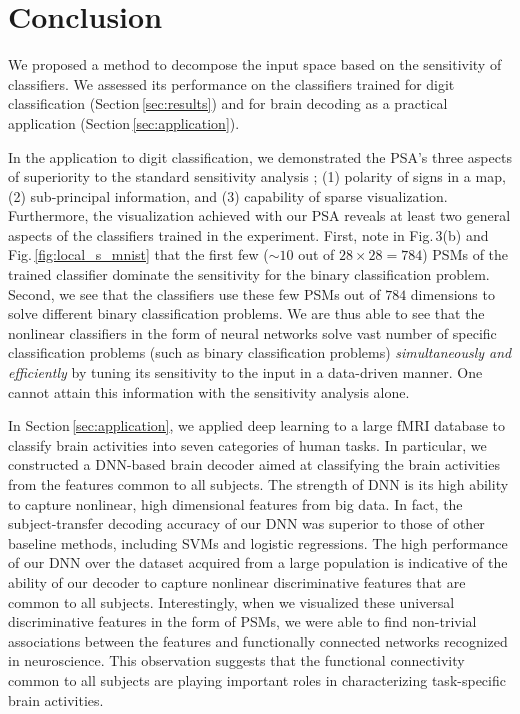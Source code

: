 \section{Conclusion}
\label{sec:discussion}
We proposed a method to decompose the input space based
on the sensitivity of classifiers.
%
We assessed its performance on the classifiers trained for
digit classification (Section\,\ref{sec:results}) and for brain
decoding as a practical application (Section\,\ref{sec:application}).


In the application to digit classification,
we demonstrated the PSA's three aspects of superiority to the standard sensitivity
analysis \cite{Zurada1994,Zurada1997,Kjems2002}; (1) polarity of signs in a map, (2)
sub-principal information, and (3) capability of sparse visualization.
Furthermore, the visualization achieved with our PSA reveals
at least two general aspects of the classifiers trained in the experiment.
%
First, note in Fig.\,3(b) and Fig.\,\ref{fig:local_s_mnist} that the first few
($\sim 10$ out of $28 \times 28 = 784$)
PSMs of the trained classifier dominate the sensitivity
for the binary classification problem.
%
Second, we see that the classifiers use these few PSMs out of $784$
dimensions to solve different binary classification problems.
%
We are thus able to see that the nonlinear classifiers in the form of
neural networks solve vast number of specific classification problems
(such as binary classification problems) \textit{simultaneously and efficiently}
by tuning its sensitivity to the input in a data-driven manner.
%
One cannot attain this information with the sensitivity analysis alone.


In Section\,\ref{sec:application}, we applied deep learning to a large
fMRI database to classify brain activities into seven categories of
human tasks.
%
In particular, we constructed a DNN-based brain decoder aimed at
classifying the brain activities from the features common to all subjects.
%
The strength of DNN is its high ability to capture nonlinear, high
dimensional features from big data.
%
In fact, the subject-transfer decoding accuracy of our DNN was superior to those of other baseline methods, including SVMs
and logistic regressions.
%
The high performance of our DNN over the dataset acquired from a large population is indicative of the ability of
our decoder to capture nonlinear discriminative features that are common to all subjects.
%
Interestingly, when we visualized these universal discriminative
features in the form of PSMs, we were able to find non-trivial
associations between the features and functionally connected networks
recognized in neuroscience.
%
This observation suggests that the functional connectivity common to all
subjects are playing important roles in characterizing task-specific
brain activities.

